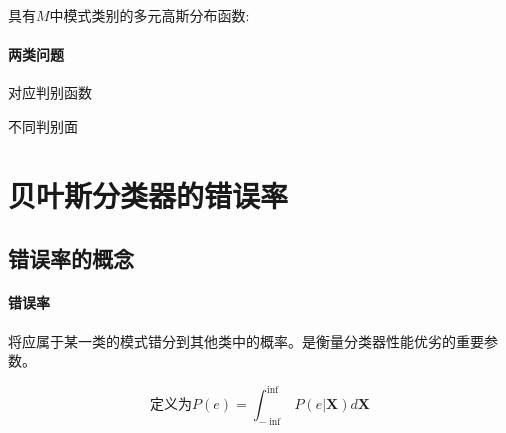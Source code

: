 \documentclass[11pt]{book}
\begin{document}
具有$M$中模式类别的多元高斯分布函数:

\paragraph{两类问题}%
\label{par:liang_lei_wen_ti_}

对应判别函数

不同判别面

\section{贝叶斯分类器的错误率}

\subsection{错误率的概念}

\paragraph{错误率}%
\label{par:cuo_wu_lu_}

将应属于某一类的模式错分到其他类中的概率。是衡量分类器性能优劣的重要参数。

\begin{equation}
	\mbox{定义为} P(e) = \int_{-\inf}^{\inf} P(e | \boldsymbol{X}) d\boldsymbol{X}
\end{equation}
\end{document}
